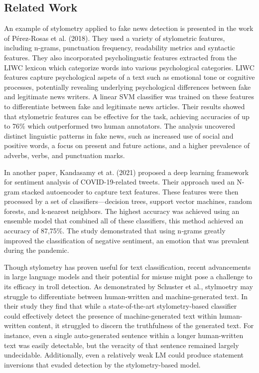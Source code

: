 \documentclass[twoside]{ctuthesis}
\theoremstyle{plain}
\theoremstyle{definition}
\theoremstyle{note}
\begin{document}
\subsection{Related Work}
An example of stylometry applied to fake news detection is presented in the work of Pérez-Rosas et al. (2018).\cite{PerezRosas2018Stylometry} They used a variety of stylometric features, including n-grams, punctuation frequency, readability metrics and syntactic features. They also incorporated psycholingustic features extracted from the LIWC lexicon which categorize words into various psychological categories. LIWC features capture psychological aspets of a text such as emotional tone or cognitive processes, potentially revealing underlying psychological differences between fake and legitimate news writers. A linear SVM classifier was trained on these features to differentiate between fake and legitimate news articles. Their results showed that stylometric features can be effective for the task, achieving accuracies of up to 76\% which outperformed two human annotators. The analysis uncovered distinct linguistic patterns in fake news, such as increased use of social and positive words, a focus on present and future actions, and a higher prevalence of adverbs, verbs, and punctuation marks. 

In another paper, Kandasamy et at. (2021)\cite{Kandasamy2021COVID} proposed a deep learning framework for sentiment analysis of COVID-19-related tweets. Their approach used an N-gram stacked autoencoder to capture text features. These features were then processed by a set of classifiers—decision trees, support vector machines, random forests, and k‑nearest neighbors. The highest accuracy was achieved using an ensemble model that combined all of these classifiers, this method achieved an accuracy of 87,75\%. The study demonstrated that using n‑grams greatly improved the classification of negative sentiment, an emotion that was prevalent during the pandemic.

Though stylometry has proven useful for text classification, recent advancements in large language models and their potential for misuse might pose a challenge to its efficacy in troll detection. As demonstrated by Schuster et al.\cite{Schuster2020}, stylmoetry may struggle to differentiate between human-written and machine-generated text. In their study they find that while a state-of-the-art stylometry-based classifier could effectively detect the presence of machine-generated text within human-written content, it struggled to discern the truthfulness of the generated text.  For instance, even a single auto-generated sentence within a longer human-written text was easily detectable, but the veracity of that sentence remained largely undecidable.  Additionally, even a relatively weak LM could produce statement inversions that evaded detection by the stylometry-based model.
\end{document}
